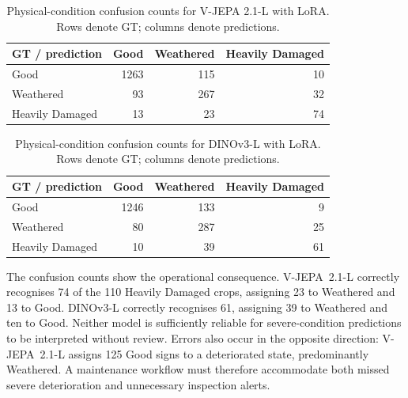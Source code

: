 \begin{table}[htbp]
\centering
\small
\caption{Physical-condition confusion counts for V-JEPA 2.1-L with LoRA. Rows denote \gls{GT}; columns denote predictions.}
\label{tab:ev-condition-vjepa}
\renewcommand{\arraystretch}{1.15}
\begin{tabularx}{\textwidth}{@{}>{\raggedright\arraybackslash}Xrrr@{}}
\toprule
GT / prediction & Good & Weathered & Heavily Damaged \\
\midrule
Good & 1263 & 115 & 10 \\
Weathered & 93 & 267 & 32 \\
Heavily Damaged & 13 & 23 & 74 \\
\bottomrule
\end{tabularx}
\end{table}


\begin{table}[htbp]
\centering
\small
\caption{Physical-condition confusion counts for DINOv3-L with LoRA. Rows denote \gls{GT}; columns denote predictions.}
\label{tab:ev-condition-dino}
\renewcommand{\arraystretch}{1.15}
\begin{tabularx}{\textwidth}{@{}>{\raggedright\arraybackslash}Xrrr@{}}
\toprule
GT / prediction & Good & Weathered & Heavily Damaged \\
\midrule
Good & 1246 & 133 & 9 \\
Weathered & 80 & 287 & 25 \\
Heavily Damaged & 10 & 39 & 61 \\
\bottomrule
\end{tabularx}
\end{table}


The confusion counts show the operational consequence. V-JEPA~2.1-L correctly recognises 74 of the 110 Heavily Damaged crops, assigning 23 to Weathered and 13 to Good. DINOv3-L correctly recognises 61, assigning 39 to Weathered and ten to Good. Neither model is sufficiently reliable for severe-condition predictions to be interpreted without review. Errors also occur in the opposite direction: V-JEPA~2.1-L assigns 125 Good signs to a deteriorated state, predominantly Weathered. A maintenance workflow must therefore accommodate both missed severe deterioration and unnecessary inspection alerts.

